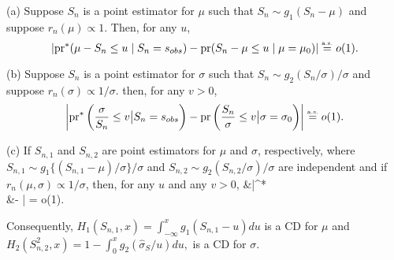 \begin{cor}\label{cor:pivot}
{\it 

\noindent (a) Suppose $S_n$ is a point estimator for $\mu$ such that $S_n \sim g_1(S_n - \mu)$ and suppose $r_{n}(\mu) \propto 1$. Then, for any $u$,  
$$|\text{pr}^*(\mu  - S_n  \leq u\mid S_n=s_{obs})-  \text{pr}(S_n  - \mu \leq u \mid \mu= \mu_0)| \stackrel{\hbox{\tiny a.s.}} =  o(1).$$ 

\noindent (b) Suppose $S_n$ is a point estimator for $\sigma$ such that $S_n \sim g_2(S_n/ \sigma )/\sigma$ and suppose $r_{n}(\sigma) \propto 1 / \sigma$. then, for any $v>0$, 
$$\left|\text{pr}^*\left(\frac{\sigma}{S_n}  \leq v \big| S_n = s_{obs}\right)-  \text{pr}\left(\frac{S_n}{\sigma} \leq v \big| \sigma = \sigma_0 \right) \right| \stackrel{\hbox{\tiny a.s.}} =   o(1).$$

\noindent (c) If $S_{n,1}$ and $S_{n,2}$ are point estimators for $\mu$ and $\sigma$, respectively, where $S_{n,1} \sim g_1\{(S_{n,1} - \mu)/ \sigma \}/\sigma $ and $S_{n,2} \sim g_2\left( S_{n,2}/ \sigma\right)/\sigma$ are independent and if $r_{n}(\mu, \sigma) \propto 1 / \sigma$, then, for any $u$ and any $v > 0$, 
\bes 
&\Big|^*\left[\begin{pmatrix}\mu - S_{n,1}  \leq u\\ \frac{\sigma}{S_{n,2}}  \leq v
\end{pmatrix}
\big| 
\begin{pmatrix}
S_{n,1} \\
S_{n,2}
\end{pmatrix} = 
\begin{pmatrix}
s_{1,obs} \\
s_{2, obs}
\end{pmatrix} \right] \qquad \qquad \\
&\qquad \qquad - \left[
\begin{pmatrix}
\mu - S_{n,1}  \leq u \\
\frac{S_{n,2}}{\sigma} \leq v 
\end{pmatrix}
\big| 
\begin{pmatrix}
\mu \\ \sigma 
\end{pmatrix} =
\begin{pmatrix}\mu_0\\  \sigma_0\end{pmatrix}
\right]\Big|  =  o(1). 
\ees

\noindent Consequently, $H_1(S_{n,1}, x) = \int_{-\infty}^{x}g_1(S_{n,1}-u)du $ is a CD for $\mu$  %
and $H_2(S_{n,2}^2,x) = 1 - \int_{0}^{x} g_2(\hat{\sigma}_{S}/u)du,$ is a CD for $\sigma$. %
}
\end{cor}

